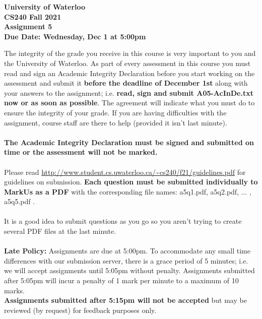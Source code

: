 \documentclass[12pt]{article}
\begin{document}
	
	\begin{center}
		{\Large\bf University of Waterloo}\\
		\vspace{3mm}
		{\Large\bf CS240 Fall 2021}\\
		\vspace{2mm}
		{\Large\bf Assignment 5}\\
		\vspace{3mm}
		\textbf{Due Date: Wednesday, Dec 1 at 5:00pm}
	\end{center}
	
	\def\question#1{\item[\bf #1.]}
	\def\part#1{\item[\bf #1)]}
	\newcommand{\pc}[1]{\mbox{\textbf{#1}}} %
	
	The integrity of the grade you receive in this course is very important to you and the University of Waterloo.  
	As part of every assessment in this course you must read and sign an Academic Integrity Declaration before you start working on the assessment and submit it \textbf{before the deadline of December 1st} along with your answers to the assignment; i.e. \textbf{read, sign and submit A05-AcInDe.txt now or as soon as possible}.
	The agreement will indicate what you must do to ensure the integrity of your grade.
	If you are having difficulties with the assignment, course staff are there to help (provided it isn't last minute). \\
	~\\
	\textbf{The Academic Integrity Declaration must be signed and submitted on time or the assessment will not be marked.} \\
	~\\
	Please read \url{http://www.student.cs.uwaterloo.ca/~cs240/f21/guidelines.pdf} for guidelines on submission.  
	\textbf{Each question must be submitted individually to MarkUs as a PDF} with the corresponding file names: 
	a5q1.pdf, a5q2.pdf, ... , a5q5.pdf . \\
	~\\
	It is a good idea to submit questions as you go so you aren't trying to create several PDF files at the last minute. \\
	~\\
	\textbf{Late Policy:} Assignments are due at 5:00pm.
	To accommodate any small time differences with our submission server, there is a grace period of 5 minutes; i.e. we will accept assignments until 5:05pm without penalty.  
	Assignments submitted after 5:05pm will incur a penalty of 1 mark per minute to a maximum of 10 marks.   \\
	\textbf{Assignments submitted after 5:15pm will not be accepted} but may be reviewed (by request) for feedback purposes only. \\  
	~\\
	
\end{document}

